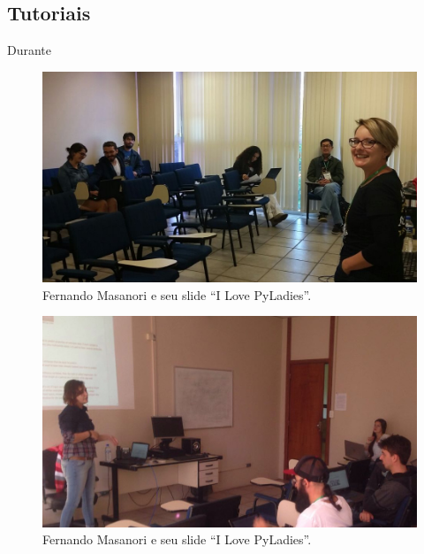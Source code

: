 \documentclass[12pt]{article}
\begin{document}
\subsection*{Tutoriais}

Durante

\noindent  %
\begin{figure}[!htb]
\center
\includegraphics[height=.3\textheight]{tutorial-latex.jpg}
\caption{Fernando Masanori e seu slide ``I Love PyLadies''.}
\end{figure}

\noindent  %
\begin{figure}[!htb]
\center
\includegraphics[height=.3\textheight]{tutorial-pyopencl.jpg}
\caption{Fernando Masanori e seu slide ``I Love PyLadies''.}
\end{figure}
\end{document}
